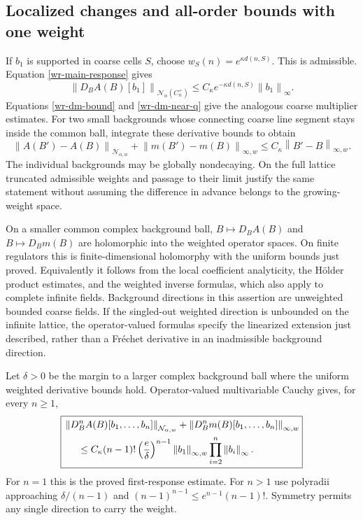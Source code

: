 \documentclass[11pt]{article}
\theoremstyle{remark}
\newcommand{\norm}[1]{\left\|#1\right\|}
\begin{document}
\subsection{Localized changes and all-order bounds with one weight}
\label{wr-localization}

If $b_1$ is supported in coarse cells $S$, choose
$w_S(n)=e^{\kappa d(n,S)}$. This is admissible. Equation
\eqref{wr-main-response} gives
\begin{equation}\label{wr-local-response}
 \norm{D_BA(B)[b_1]}_{\mathcal N_\alpha(C_n^+)}
 \le C_\kappa e^{-\kappa d(n,S)}\norm{b_1}_\infty.
\end{equation}
Equations \eqref{wr-dm-bound} and \eqref{wr-dm-near-q}
give the analogous coarse multiplier estimates. For two small
backgrounds whose connecting coarse line segment stays inside
the common ball, integrate these derivative bounds to obtain
\begin{equation}\label{wr-finite-difference}
 \norm{A(B')-A(B)}_{\mathcal N_{\alpha,w}}
 +\norm{m(B')-m(B)}_{\infty,w}
 \le C_\kappa\norm{B'-B}_{\infty,w}.
\end{equation}
The individual backgrounds may be globally nondecaying. On the
full lattice truncated admissible weights and passage to their
limit justify the same statement without assuming the difference
in advance belongs to the growing-weight space.

On a smaller common complex background ball,
$B\mapsto D_BA(B)$ and $B\mapsto D_Bm(B)$ are holomorphic
into the weighted operator spaces. On finite regulators this is
finite-dimensional holomorphy with the uniform bounds just
proved. Equivalently it follows from the local coefficient
analyticity, the H\"older product estimates, and the weighted
inverse formulas, which also apply to complete infinite fields.
Background directions in this assertion are unweighted bounded
coarse fields. If the singled-out weighted direction is unbounded
on the infinite lattice, the operator-valued formulas specify the
linearized extension just described, rather than a Fr\'echet
derivative in an inadmissible background direction.

Let $\delta>0$ be the margin to a larger complex background ball
where the uniform weighted derivative bounds hold. Operator-valued
multivariable Cauchy gives, for every $n\ge1$,
\begin{equation}\label{wr-all-orders}
 \boxed{\begin{split}
 &\norm{D_B^n A(B)[b_1,\ldots,b_n]}_{\mathcal N_{\alpha,w}}
       +\norm{D_B^n m(B)[b_1,\ldots,b_n]}_{\infty,w}\\
 &\hspace{5mm}\le C_\kappa(n-1)!
       \left(\frac e\delta\right)^{n-1}
        \norm{b_1}_{\infty,w}\prod_{i=2}^n\norm{b_i}_\infty.
 \end{split}}
\end{equation}
For $n=1$ this is the proved first-response estimate. For $n>1$
use polyradii approaching $\delta/(n-1)$ and
$(n-1)^{n-1}\le e^{n-1}(n-1)!$. Symmetry permits any single
direction to carry the weight.
\end{document}

